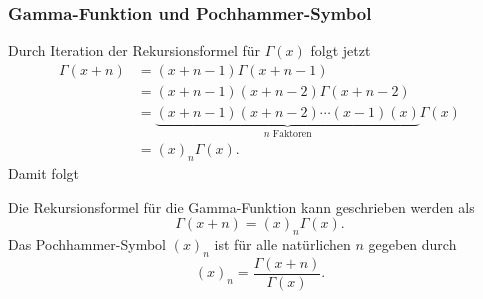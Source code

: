 %
%
\subsubsection{Gamma-Funktion und Pochhammer-Symbol}
Durch Iteration der Rekursionsformel für $\Gamma(x)$ folgt jetzt
\begin{align*}
\Gamma(x+n)
&=
(x+n-1) \Gamma(x+n-1)
\\
&=
(x+n-1)(x+n-2)\Gamma(x+n-2)
\\
&=
\underbrace{
(x+n-1)(x+n-2)\cdots(x-1)(x)
}_{\text{$n$ Faktoren}} \Gamma(x)
\\
&=(x)_n \Gamma(x).
\end{align*}
Damit folgt

\begin{satz}
\label{buch:rekursion:gamma:satz:gamma-pochhammer}
Die Rekursionsformel für die Gamma-Funktion kann geschrieben werden als
\[
\Gamma(x+n) = (x)_n \Gamma(x).
\]
Das Pochhammer-Symbol $(x)_n$ ist für alle natürlichen $n$ gegeben durch
\[
(x)_n = \frac{\Gamma(x+n)}{\Gamma(x)}.
\]
\end{satz}

%
%
